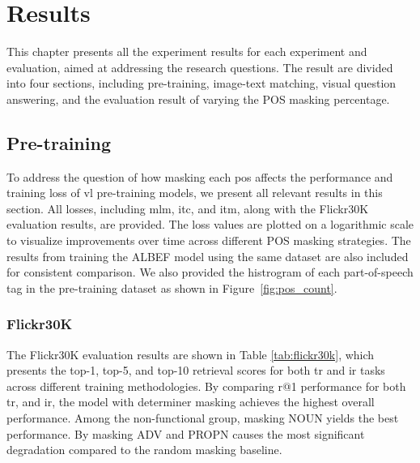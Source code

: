 \chapter{Results}
This chapter presents all the experiment results for each experiment and evaluation, aimed at addressing the research questions.
The result are divided into four sections, including pre-training, image-text matching, visual question answering, and the evaluation result of varying the POS masking percentage.

\section{Pre-training}
To address the question of how masking each \acrshort{pos} affects the performance and training loss of \acrshort{vl} pre-training models, we present all relevant results in this section.  
All losses, including \acrshort{mlm}, \acrshort{itc}, and \acrshort{itm}, along with the Flickr30K evaluation results, are provided.  
The loss values are plotted on a logarithmic scale to visualize improvements over time across different POS masking strategies.  
The results from training the ALBEF model using the same dataset are also included for consistent comparison.
We also provided the histrogram of each part-of-speech tag in the pre-training dataset as shown in Figure~\ref{fig:pos_count}.

\subsection{Flickr30K}
The Flickr30K evaluation results are shown in Table \ref{tab:flickr30k}, which presents the top-1, top-5, and top-10 retrieval scores for both \acrshort{tr} and \acrshort{ir} tasks across different training methodologies.  
By comparing r@1 performance for both \acrshort{tr}, and \acrshort{ir}, the model with determiner masking achieves the highest overall performance.
Among the non-functional group, masking NOUN yields the best performance.
By masking ADV and PROPN causes the most significant degradation compared to the random masking baseline.

